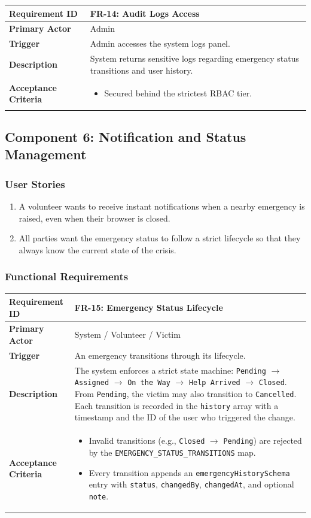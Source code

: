 \documentclass[12pt,a4paper]{article}
\newcommand{\frbox}[5]{%
  \begin{table}[H]
  \centering
  \begin{tabularx}{\textwidth}{|l|X|}
  \hline
  \rowcolor{lightorange}
  \textbf{Requirement ID} & \textbf{#1} \\
  \hline
  \textbf{Primary Actor} & #2 \\
  \hline
  \textbf{Trigger} & #3 \\
  \hline
  \textbf{Description} & #4 \\
  \hline
  \rowcolor{lightorange}
  \textbf{Acceptance Criteria} & #5 \\
  \hline
  \end{tabularx}
  \end{table}
}
\begin{document}
\frbox{FR-14: Audit Logs Access}
{Admin}
{Admin accesses the system logs panel.}
{System returns sensitive logs regarding emergency status transitions and user history.}
{%
\begin{itemize}[leftmargin=1.5em]
  \item Secured behind the strictest RBAC tier.
\end{itemize}
}

\subsection{Component 6: Notification and Status Management}

\subsubsection*{User Stories}
\begin{enumerate}[leftmargin=2em]
  \item A volunteer wants to receive instant notifications when a nearby emergency is raised, even when their browser is closed.
  \item All parties want the emergency status to follow a strict lifecycle so that they always know the current state of the crisis.
\end{enumerate}

\subsubsection*{Functional Requirements}

\frbox{FR-15: Emergency Status Lifecycle}
{System / Volunteer / Victim}
{An emergency transitions through its lifecycle.}
{The system enforces a strict state machine: \texttt{Pending} $\rightarrow$ \texttt{Assigned} $\rightarrow$ \texttt{On the Way} $\rightarrow$ \texttt{Help Arrived} $\rightarrow$ \texttt{Closed}. From \texttt{Pending}, the victim may also transition to \texttt{Cancelled}. Each transition is recorded in the \texttt{history} array with a timestamp and the ID of the user who triggered the change.}
{%
\begin{itemize}[leftmargin=1.5em]
  \item Invalid transitions (e.g., \texttt{Closed} $\rightarrow$ \texttt{Pending}) are rejected by the \texttt{EMERGENCY\_STATUS\_TRANSITIONS} map.
  \item Every transition appends an \texttt{emergencyHistorySchema} entry with \texttt{status}, \texttt{changedBy}, \texttt{changedAt}, and optional \texttt{note}.
\end{itemize}
}
\end{document}
